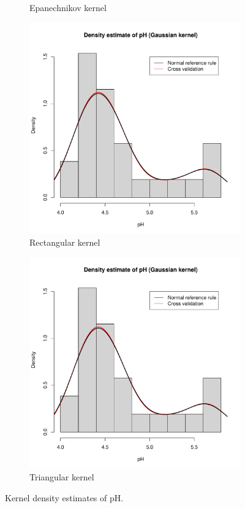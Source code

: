 \documentclass[10pt]{article}
\begin{document}
\begin{figure}[H]
\begin{subfigure}[b]{0.45\textwidth}
             \caption{Epanechnikov kernel}
         \end{subfigure}
         \hfill
         \begin{subfigure}[b]{0.45\textwidth}
             \centering
             \includegraphics[width=\textwidth, page = 3]{acid-rain.pdf}
             \caption{Rectangular kernel}
         \end{subfigure}
         \begin{subfigure}[b]{0.45\textwidth}
             \centering
             \includegraphics[width=\textwidth, page = 4]{acid-rain.pdf}
             \caption{Triangular kernel}
         \end{subfigure}
        \caption{Kernel density estimates of pH.}
        \label{fig:kernel_density_estimates}
    \end{figure}
\end{document}
